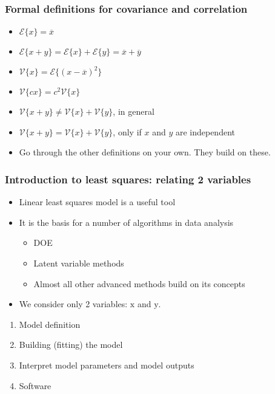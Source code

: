 \begin{frame}\frametitle{Formal definitions for covariance and correlation}
	\begin{itemize}
		\item	$\mathcal{E}\{x\} = \overline{x}$ 
		\item	$\mathcal{E}\{x+y\} = \mathcal{E}\{x\} + \mathcal{E}\{y\} = \overline{x} + \overline{y}$ 
		\item	$\mathcal{V}\{x\} = \mathcal{E}\{(x-\overline{x})^2\}$ 
		\item	$\mathcal{V}\{cx\} = c^2\mathcal{V}\{x\}$ 
		\item	$\mathcal{V}\{x+y\} \neq \mathcal{V}\{x\} + \mathcal{V}\{y\}$, in general 
		\item	$\mathcal{V}\{x+y\} = \mathcal{V}\{x\} + \mathcal{V}\{y\}$, only if $x$ and $y$ are independent 
		\item	Go through the other definitions on your own. They build on these. 
	\end{itemize}
\end{frame}

\begin{frame}\frametitle{Introduction to least squares: relating 2 variables}
	\begin{itemize}
		\item	Linear least squares model is a useful tool 
		\item	It is the basis for a number of algorithms in data analysis 
		\begin{itemize}
			\item	DOE 
			\item	Latent variable methods 
			\item	Almost all other advanced methods build on its concepts 
		\end{itemize}
	\end{itemize}
	\begin{itemize}
		\item	We consider only 2 variables: $\mathrm{x}$ and $\mathrm{y}$. 
	\end{itemize}
	\begin{enumerate}
		\item	Model definition 
		\item	Building (fitting) the model 
		\item	Interpret model parameters and model outputs 
		\item	Software 
	\end{enumerate}
\end{frame}

